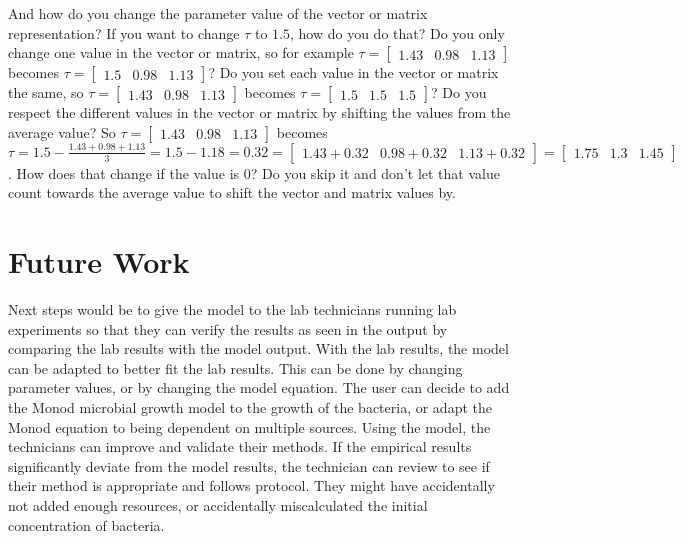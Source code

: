 And how do you change the parameter value of the vector or matrix representation? 
If you want to change $\tau$ to $1.5$, how do you do that? 
Do you only change one value in the vector or matrix, so for example $\tau = \begin{bmatrix} 1.43 & 0.98 & 1.13\end{bmatrix}$ becomes $\tau = \begin{bmatrix} 1.5 & 0.98 & 1.13\end{bmatrix}$? 
Do you set each value in the vector or matrix the same, so $\tau = \begin{bmatrix} 1.43 & 0.98 & 1.13\end{bmatrix}$ becomes $\tau = \begin{bmatrix} 1.5 & 1.5 & 1.5\end{bmatrix}$? 
Do you respect the different values in the vector or matrix by shifting the values from the average value? 
So $\tau = \begin{bmatrix} 1.43 & 0.98 & 1.13\end{bmatrix}$ becomes $\tau = 1.5 - \frac{1.43 + 0.98 + 1.13}{3} = 1.5-1.18 = 0.32 = \begin{bmatrix} 1.43+0.32 & 0.98+0.32 & 1.13+0.32\end{bmatrix} = \begin{bmatrix} 1.75 & 1.3 & 1.45\end{bmatrix}$. 
How does that change if the value is 0?
Do you skip it and don't let that value count towards the average value to shift the vector and matrix values by. 

\section{Future Work}
\label{Future Work}
Next steps would be to give the model to the lab technicians running lab experiments so that they can verify the results as seen in the output by comparing the lab results with the model output. 
With the lab results, the model can be adapted to better fit the lab results. 
This can be done by changing parameter values, or by changing the model equation. 
The user can decide to add the Monod microbial growth model to the growth of the bacteria, or adapt the Monod equation to being dependent on multiple sources. 
Using the model, the technicians can improve and validate their methods. 
If the empirical results significantly deviate from the model results, the technician can review to see if their method is appropriate and follows protocol. 
They might have accidentally not added enough resources, or accidentally miscalculated the initial concentration of bacteria. 

